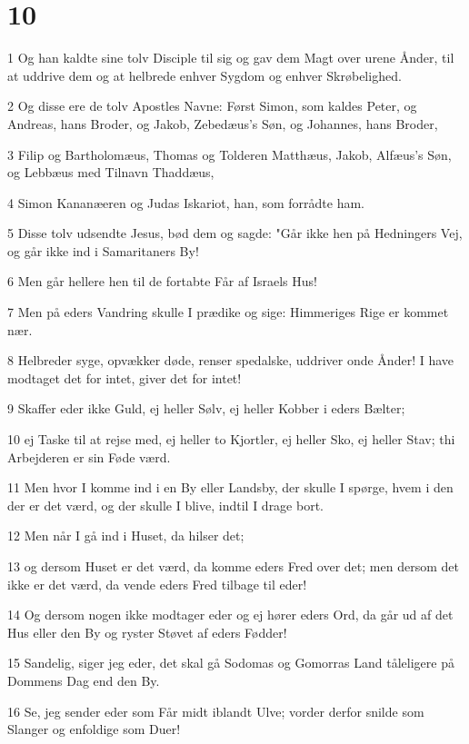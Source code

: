 \chapter{10}

\par 1 Og han kaldte sine tolv Disciple til sig og gav dem Magt over urene Ånder, til at uddrive dem og at helbrede enhver Sygdom og enhver Skrøbelighed.
\par 2 Og disse ere de tolv Apostles Navne: Først Simon, som kaldes Peter, og Andreas, hans Broder, og Jakob, Zebedæus's Søn, og Johannes, hans Broder,
\par 3 Filip og Bartholomæus, Thomas og Tolderen Matthæus, Jakob, Alfæus's Søn, og Lebbæus med Tilnavn Thaddæus,
\par 4 Simon Kananæeren og Judas Iskariot, han, som forrådte ham.
\par 5 Disse tolv udsendte Jesus, bød dem og sagde: "Går ikke hen på Hedningers Vej, og går ikke ind i Samaritaners By!
\par 6 Men går hellere hen til de fortabte Får af Israels Hus!
\par 7 Men på eders Vandring skulle I prædike og sige: Himmeriges Rige er kommet nær.
\par 8 Helbreder syge, opvækker døde, renser spedalske, uddriver onde Ånder! I have modtaget det for intet, giver det for intet!
\par 9 Skaffer eder ikke Guld, ej heller Sølv, ej heller Kobber i eders Bælter;
\par 10 ej Taske til at rejse med, ej heller to Kjortler, ej heller Sko, ej heller Stav; thi Arbejderen er sin Føde værd.
\par 11 Men hvor I komme ind i en By eller Landsby, der skulle I spørge, hvem i den der er det værd, og der skulle I blive, indtil I drage bort.
\par 12 Men når I gå ind i Huset, da hilser det;
\par 13 og dersom Huset er det værd, da komme eders Fred over det; men dersom det ikke er det værd, da vende eders Fred tilbage til eder!
\par 14 Og dersom nogen ikke modtager eder og ej hører eders Ord, da går ud af det Hus eller den By og ryster Støvet af eders Fødder!
\par 15 Sandelig, siger jeg eder, det skal gå Sodomas og Gomorras Land tåleligere på Dommens Dag end den By.
\par 16 Se, jeg sender eder som Får midt iblandt Ulve; vorder derfor snilde som Slanger og enfoldige som Duer!
